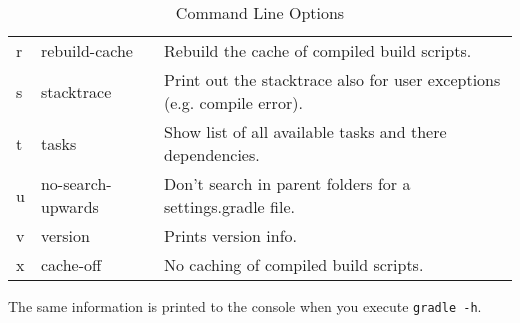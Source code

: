 \begin{table}
\begin{center}
\begin{tabular}{l|l|l}
r & rebuild-cache    & Rebuild the cache of compiled build scripts.\\
s & stacktrace       & Print out the stacktrace also for user exceptions (e.g. compile error).\\
t & tasks            & Show list of all available tasks and there dependencies.\\
u & no-search-upwards  & Don't search in parent folders for a settings.gradle file.\\
v & version          & Prints version info.\\
x & cache-off        & No caching of compiled build scripts.\\
\end{tabular}
\end{center}
\caption{Command Line Options}
\label{command_line_options}
\end{table}
 
\noindent The same information is printed to the console when you execute \texttt{gradle -h}.
